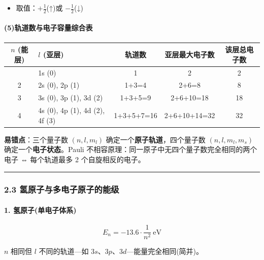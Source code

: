 \begin{itemize}
\tightlist
\item
  取值：\(+\frac{1}{2}\)(↑)或 \(-\frac{1}{2}\)(↓)
\end{itemize}

\paragraph{(5)轨道数与电子容量综合表}\label{ux8f68ux9053ux6570ux4e0eux7535ux5b50ux5bb9ux91cfux7efcux5408ux8868}

{\def\LTcaptype{none} %
\begin{longtable}[]{@{}clccc@{}}
\toprule\noalign{}
\(n\) (能层) & \(l\) (亚层) & 轨道数 & 亚层最大电子数 & 该层总电子数 \\
\midrule\noalign{}
\endhead
\bottomrule\noalign{}
\endlastfoot
1 & 1s (0) & 1 & 2 & 2 \\
2 & 2s (0), 2p (1) & 1+3=4 & 2+6=8 & 8 \\
3 & 3s (0), 3p (1), 3d (2) & 1+3+5=9 & 2+6+10=18 & 18 \\
4 & 4s (0), 4p (1), 4d (2), 4f (3) & 1+3+5+7=16 & 2+6+10+14=32 & 32 \\
\end{longtable}
}

\textbf{易错点}：三个量子数 \((n,l,m_l)\) 确定一个\textbf{原子轨道}，四个量子数 \((n,l,m_l,m_s)\) 确定一个\textbf{电子状态}。Pauli 不相容原理：同一原子中无四个量子数完全相同的两个电子 ⇔ 每个轨道最多 2 个自旋相反的电子。

\begin{center}\rule{0.5\linewidth}{0.5pt}\end{center}

\subsubsection{2.3 氢原子与多电子原子的能级}\label{ux6c22ux539fux5b50ux4e0eux591aux7535ux5b50ux539fux5b50ux7684ux80fdux7ea7}

\paragraph{1. 氢原子(单电子体系)}\label{ux6c22ux539fux5b50ux5355ux7535ux5b50ux4f53ux7cfb}

\[E_n = -13.6 \cdot \frac{1}{n^2}\ \mathrm{eV}\]

\(n\) 相同但 \(l\) 不同的轨道---如 \(3s\)、\(3p\)、\(3d\)---能量完全相同(简并)。

